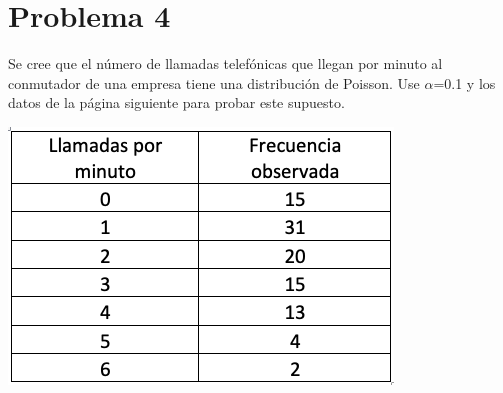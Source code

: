\documentclass[a4paper,12pt]{article}
\begin{document}
\section{Problema 4}

Se cree que el número de llamadas telefónicas que llegan por minuto al conmutador de una empresa tiene una distribución de Poisson. Use $\alpha$=0.1   y los datos de la página siguiente para probar este supuesto. 
\begin{center}
    \includegraphics[scale=0.45]{images/Screen Shot 2021-05-11 at 17.00.54.png}
\end{center}
\end{document}
